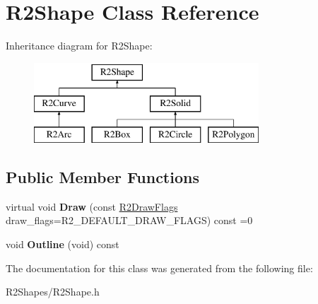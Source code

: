 \hypertarget{class_r2_shape}{}\section{R2\+Shape Class Reference}
\label{class_r2_shape}
Inheritance diagram for R2\+Shape\+:\begin{figure}[H]
\begin{center}
\leavevmode
\includegraphics[height=3.000000cm]{class_r2_shape}
\end{center}
\end{figure}
\subsection*{Public Member Functions}
\begin{DoxyCompactItemize}
\item 
virtual void {\bfseries Draw} (const \hyperlink{class_r_n_flags}{R2\+Draw\+Flags} draw\+\_\+flags=R2\+\_\+\+D\+E\+F\+A\+U\+L\+T\+\_\+\+D\+R\+A\+W\+\_\+\+F\+L\+A\+GS) const  =0\hypertarget{class_r2_shape_ac3d8ebb888ca8c1ba867cd74a43a3067}{}\label{class_r2_shape_ac3d8ebb888ca8c1ba867cd74a43a3067}

\item 
void {\bfseries Outline} (void) const \hypertarget{class_r2_shape_a17b4090e3d887eb65d3d4444765ab7a1}{}\label{class_r2_shape_a17b4090e3d887eb65d3d4444765ab7a1}

\end{DoxyCompactItemize}


The documentation for this class was generated from the following file\+:\begin{DoxyCompactItemize}
\item 
R2\+Shapes/R2\+Shape.\+h\end{DoxyCompactItemize}
